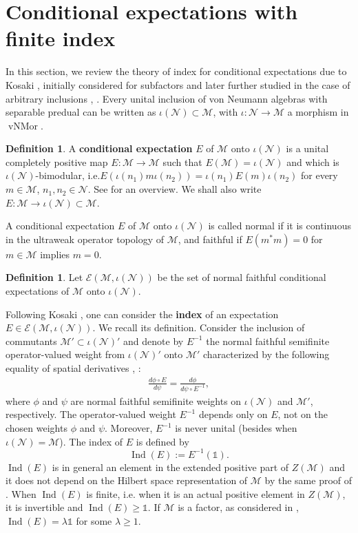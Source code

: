 \documentclass[11pt,a4paper]{article}
\makeatletter
\newcommand{\oneop}{\mathds{1}}
\newcommand{\E}{\mathcal{E}}
\newcommand{\M}{\mathcal{M}}
\newcommand{\N}{\mathcal{N}}
\DeclareMathOperator{\vNMor}{vNMor}
\DeclareMathOperator{\Ind}{Ind}
\DeclareRobustCommand{\ie}{i.e.\@\xspace}
\DeclareRobustCommand{\Sec}{Sec.\@\xspace}
\DeclareRobustCommand{\Thm}{Thm.\@\xspace}
\theoremstyle{plain}
\theoremstyle{definition}
\newtheorem{defi}[thm]{Definition}
\theoremstyle{remark}
\numberwithin{equation}{section}%
\makeatother
\begin{document}
\section{Conditional expectations with finite index}\label{sec:condexp}


In this section, we review the theory of index for conditional expectations due to Kosaki \cite{Kos86}, initially considered for subfactors and later further studied in the case of arbitrary inclusions \cite{BDH88}, \cite{PopBook}.
Every unital inclusion of von Neumann algebras with separable predual can be written as $\iota(\N)\subset\M$, with $\iota:\N\to\M$ a morphism in $\vNMor$.

\begin{defi}
A \textbf{conditional expectation} $E$ of $\M$ onto $\iota(\N)$ is a unital completely positive map $E:\M\to\M$ such that $E(\M) = \iota(\N)$ and which is $\iota(\N)$-bimodular, \ie $E(\iota(n_1)m\iota(n_2)) = \iota(n_1)E(m)\iota(n_2)$ for every $m\in\M$, $n_1,n_2\in\N$. See \cite{Sto97} for an overview.
We shall also write $E:\M\to\iota(\N)\subset\M$.
\end{defi}

A conditional expectation $E$ of $\M$ onto $\iota(\N)$ is called normal if it is continuous in the ultraweak operator topology of $\M$, and faithful if $E(m^*m) = 0$ for $m\in\M$ implies $m = 0$.

\begin{defi}
Let $\E(\M,\iota(\N))$ be the set of normal faithful conditional expectations of $\M$ onto $\iota(\N)$.
\end{defi}

Following Kosaki \cite{Kos86}, one can consider the \textbf{index} of an expectation $E\in \E(\M,\iota(\N))$. We recall its definition. Consider the inclusion of commutants $\M' \subset \iota(\N)'$ and denote by $E^{-1}$ the normal faithful semifinite operator-valued weight from $\iota(\N)'$ onto $\M'$ characterized by the following equality of spatial derivatives \cite{Haa79II}, \cite{Con80}:
\begin{align}\label{eq:spderivative}
\frac{d \phi \circ E}{d \psi} = \frac{d \phi}{d \psi \circ E^{-1}},
\end{align}
where $\phi$ and $\psi$ are normal faithful semifinite weights on $\iota(\N)$ and $\M'$, respectively. The operator-valued weight $E^{-1}$ depends only on $E$, not on the chosen weights $\phi$ and $\psi$.
Moreover, $E^{-1}$ is never unital (besides when $\iota(\N) = \M$). The index of $E$ is defined by
$$\Ind(E) := E^{-1}(\oneop).$$
$\Ind(E)$ is in general an element in the extended positive part of $Z(\M)$ \cite{Haa79I} and it does not depend on the Hilbert space representation of $\M$ by the same proof of \cite[\Thm 2.2]{Kos86}. When $\Ind(E)$ is finite, \ie when it is an actual positive element in $Z(\M)$, it is invertible and $\Ind(E)\geq \oneop$. If $\M$ is a factor, as considered in \cite[\Sec 2]{Kos86}, $\Ind(E) = \lambda \oneop$ for some $\lambda \geq 1$.
\end{document}
